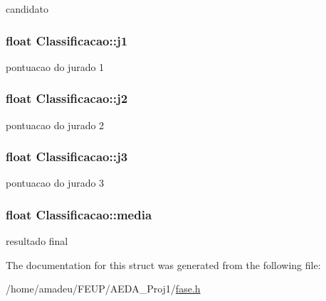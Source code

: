 candidato 

\subsubsection[{\texorpdfstring{j1}{j1}}]{\setlength{\rightskip}{0pt plus 5cm}float Classificacao\+::j1}\hypertarget{structClassificacao_abe2dfdf576aadbd510980c17d337a1a9}{}\label{structClassificacao_abe2dfdf576aadbd510980c17d337a1a9}


pontuacao do jurado 1 

\subsubsection[{\texorpdfstring{j2}{j2}}]{\setlength{\rightskip}{0pt plus 5cm}float Classificacao\+::j2}\hypertarget{structClassificacao_a1221d2875f866a4c9fea21f04888796a}{}\label{structClassificacao_a1221d2875f866a4c9fea21f04888796a}


pontuacao do jurado 2 

\subsubsection[{\texorpdfstring{j3}{j3}}]{\setlength{\rightskip}{0pt plus 5cm}float Classificacao\+::j3}\hypertarget{structClassificacao_a3fd75e4d2503d5ecdb88814b808c6929}{}\label{structClassificacao_a3fd75e4d2503d5ecdb88814b808c6929}


pontuacao do jurado 3 

\subsubsection[{\texorpdfstring{media}{media}}]{\setlength{\rightskip}{0pt plus 5cm}float Classificacao\+::media}\hypertarget{structClassificacao_a5f7d29ed16f73699cf485006bd333007}{}\label{structClassificacao_a5f7d29ed16f73699cf485006bd333007}


resultado final 



The documentation for this struct was generated from the following file\+:\begin{DoxyCompactItemize}
\item 
/home/amadeu/\+F\+E\+U\+P/\+A\+E\+D\+A\+\_\+\+Proj1/\hyperlink{fase_8h}{fase.\+h}\end{DoxyCompactItemize}
